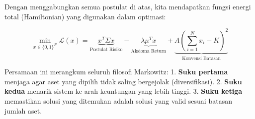Dengan menggabungkan semua postulat di atas, kita mendapatkan fungsi energi total (Hamiltonian) yang digunakan dalam optimasi:

\[ \min_{x \in \{0,1\}^N} \mathcal{L}(x) = \underbrace{x^T \Sigma x}_{\text{Postulat Risiko}} - \underbrace{\lambda \mu^T x}_{\text{Aksioma Return}} + \underbrace{A \left(\sum_{i=1}^N x_i - K \right)^2}_{\text{Konvensi Batasan}} \]

Persamaan ini merangkum seluruh filosofi Markowitz: 1. \textbf{Suku pertama} menjaga agar aset yang dipilih tidak saling bergejolak (diversifikasi). 2. \textbf{Suku kedua} menarik sistem ke arah keuntungan yang lebih tinggi. 3. \textbf{Suku ketiga} memastikan solusi yang ditemukan adalah solusi yang valid sesuai batasan jumlah aset.
